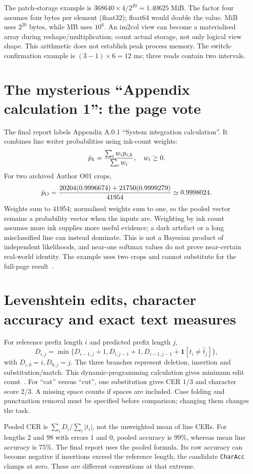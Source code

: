 The patch-storage example is $368640\times4/2^{20}=1.40625$ MiB.
The factor four assumes four bytes per element (float32); float64 would
double the value. MiB uses $2^{20}$ bytes, while MB uses $10^6$.
An im2col view can become a materialised array during reshape/multiplication;
count actual storage, not only logical view shape. This arithmetic does not
establish peak process memory. The switch-confirmation example is
$(3-1)\times6=12$ ms; three reads contain two intervals.

\section{The mysterious ``Appendix calculation 1'': the page vote}
The final report labels Appendix A.0.1 ``System integration calculation''.
It combines line writer probabilities using ink-count weights:
\[
\bar p_k={\sum_i w_i p_{i,k}\over\sum_i w_i},\quad w_i\ge0.
\]
For two archived Author O01 crops,
\[
\bar p_O={20204(0.9996674)+21750(0.9999279)\over41954}
\simeq0.9998024.
\]
Weights sum to 41954; normalised weights sum to one, so the pooled vector
remains a probability vector when the inputs are. Weighting by ink count
assumes more ink supplies more useful evidence; a dark artefact or a long
misclassified line can instead dominate. This is not a Bayesian product
of independent likelihoods, and near-one softmax values do not prove
near-certain real-world identity. The example uses two crops and cannot
substitute for the full-page result~\cite{finalreport2026}.

\section{Levenshtein edits, character accuracy and exact text measures}
For reference prefix length $i$ and predicted prefix length $j$,
\[
D_{i,j}=\min\{D_{i-1,j}+1,D_{i,j-1}+1,
D_{i-1,j-1}+\mathbf1[t_i\ne\hat t_j]\},
\]
with $D_{i,0}=i,D_{0,j}=j$. The three branches represent deletion,
insertion and substitution/match. This dynamic-programming calculation gives
minimum edit count~\cite{levenshtein1966}. For ``cat'' versus ``cut'',
one substitution gives CER $1/3$ and character score $2/3$. A missing
space counts if spaces are included. Case folding and punctuation removal
must be specified before comparison; changing them changes the task.

Pooled CER is $\sum_iD_i/\sum_i|t_i|$, not the unweighted mean of line
CERs. For lengths 2 and 98 with errors 1 and 0, pooled accuracy is 99\%,
whereas mean line accuracy is 75\%. The final report uses the pooled
formula. Its raw accuracy can become negative if insertions exceed the
reference length; the candidate \texttt{CharAcc} clamps at zero. These are
different conventions at that extreme.

